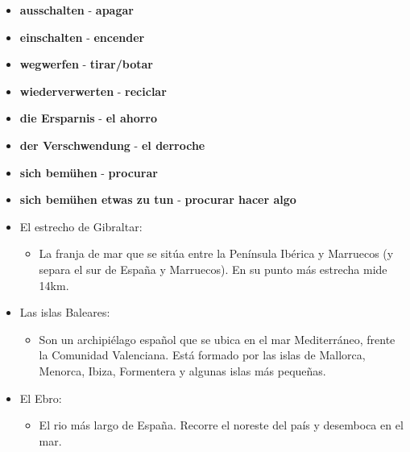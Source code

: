 \documentclass{article}
\begin{document}
\begin{multicols}{2}
\begin{itemize}
\begin{itemize}
			\item{\textbf{ausschalten} - \textbf{apagar}}
			\item{\textbf{einschalten} - \textbf{encender}}
			\item{\textbf{wegwerfen} - \textbf{tirar/botar}}
			\item{\textbf{wiederverwerten} - \textbf{reciclar}}
			\item{\textbf{die Ersparnis} - \textbf{el ahorro}}
			\item{\textbf{der Verschwendung} - \textbf{el derroche}}
			\item{\textbf{sich bemühen} - \textbf{procurar}}
			\item{\textbf{sich bemühen etwas zu tun} - \textbf{procurar hacer algo}}
		\end{itemize}
	\end{itemize}
	\end{multicols}
	\begin{itemize}
		\item{El estrecho de Gibraltar:}
		\begin{itemize}
			\item{La franja de mar que se sitúa entre la Península Ibérica y Marruecos (y separa el sur de España y Marruecos). En su punto más estrecha mide 14km.}
		\end{itemize}
		\item{Las islas Baleares:}
		\begin{itemize}
			\item{Son un archipiélago español que se ubica en el mar Mediterráneo, frente la Comunidad Valenciana. Está formado por las islas de Mallorca, Menorca, Ibiza, Formentera y algunas islas más pequeñas.}
		\end{itemize}
		\item{El Ebro:}
		\begin{itemize}
			\item{El rio más largo de España. Recorre el noreste del país y desemboca en el mar.}
		\end{itemize}
	\end{itemize}
\end{document}
